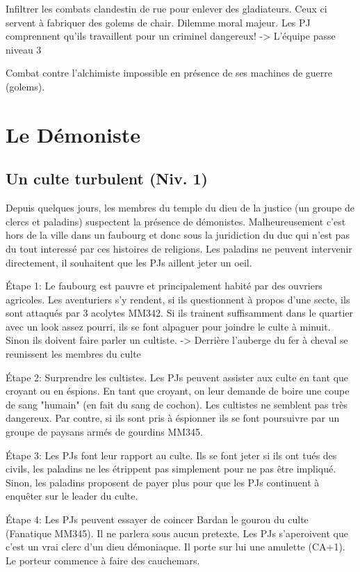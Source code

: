 Infiltrer les combats clandestin de rue pour enlever des gladiateurs. Ceux ci servent à fabriquer
des golems de chair. Dilemme moral majeur. Les PJ comprennent qu'ils travaillent pour un criminel
dangereux!
 -> L'équipe passe niveau 3

Combat contre l'alchimiste impossible en présence de ses machines de guerre (golems).

\section{Le Démoniste}

\subsection{Un culte turbulent (Niv. 1)}

Depuis quelques jours, les membres du temple du dieu de la justice (un groupe de clercs et paladins) 
suspectent la présence de démonistes. Malheureusement c'est hors de la ville dans un faubourg 
et donc sous la juridiction du duc qui n'est pas du tout interessé par ces histoires de religions.
Les paladins ne peuvent intervenir directement, il souhaitent que les PJs aillent jeter un oeil.

Étape 1: Le faubourg est pauvre et principalement habité par des ouvriers agricoles. Les aventuriers
s'y rendent, si ils questionnent à propos d'une secte, ils sont attaqués par 3 acolytes MM342. Si ils
trainent suffisamment dans le quartier avec un look assez pourri, ils se font alpaguer pour joindre le 
culte à minuit. Sinon ils doivent faire parler un cultiste.
-> Derrière l'auberge du fer à cheval se reunissent les membres du culte

Étape 2: Surprendre les cultistes. Les PJs peuvent assister aux culte en tant que croyant ou en éspions.
En tant que croyant, on leur demande de boire une coupe de sang "humain" (en fait du sang de cochon).
Les cultistes ne semblent pas très dangereux. Par contre, si ils sont pris à éspionner ils se font 
poursuivre par un groupe de paysans armés de gourdins MM345.

Étape 3: Les PJs font leur rapport au culte. Ils se font jeter si ils ont tués des civils, les paladins ne 
les étrippent pas simplement pour ne pas être impliqué. Sinon, les paladins proposent de payer plus pour 
que les PJs continuent à enquêter sur le leader du culte.

Étape 4: Les PJs peuvent essayer de coincer Bardan le gourou du culte (Fanatique MM345). Il ne parlera
sous aucun pretexte. Les PJs s'aperoivent que c'est un vrai clerc d'un dieu démoniaque. Il porte sur lui 
une amulette (CA+1). Le porteur commence à faire des cauchemars.

